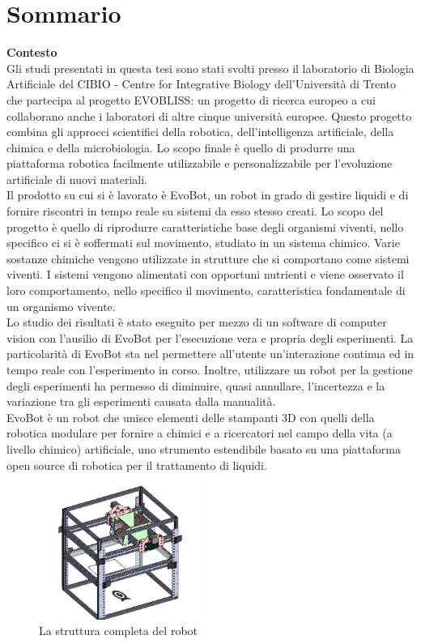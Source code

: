 \chapter*{Sommario} %
\label{sommario}

\textbf{Contesto}
\\Gli studi presentati in questa tesi sono stati svolti presso il laboratorio di Biologia Artificiale del CIBIO - Centre for Integrative Biology dell'Università di Trento che partecipa al progetto EVOBLISS: un progetto di ricerca europeo a cui collaborano anche i laboratori di altre cinque università europee. Questo progetto combina gli approcci scientifici della robotica, dell'intelligenza artificiale, della chimica e della microbiologia. Lo scopo finale è quello di produrre una piattaforma robotica facilmente utilizzabile e personalizzabile per l'evoluzione artificiale di nuovi materiali. 
\\Il prodotto su cui si è lavorato è EvoBot, un robot in grado di gestire liquidi e di fornire riscontri in tempo reale su sistemi da esso stesso creati. Lo scopo del progetto è quello di riprodurre caratteristiche base degli organismi viventi, nello specifico ci si è soffermati sul movimento, studiato in un sistema chimico. Varie sostanze chimiche vengono utilizzate in strutture che si comportano come sistemi viventi. I sistemi vengono alimentati con opportuni nutrienti e viene osservato il loro comportamento, nello specifico il movimento, caratteristica fondamentale di un organismo vivente. 
\\Lo studio dei risultati è stato eseguito per mezzo di un software di computer vision con l'ausilio di EvoBot per l’esecuzione vera e propria degli esperimenti. La particolarità di EvoBot sta nel permettere all'utente un'interazione continua ed in tempo reale con l'esperimento in corso.\cite{introd-robot} Inoltre, utilizzare un robot per la gestione degli esperimenti ha permesso di diminuire, quasi annullare, l'incertezza e la variazione tra gli esperimenti causata dalla manualità. 
\\EvoBot è un robot che unisce elementi delle stampanti 3D con quelli della robotica modulare per fornire a chimici e a ricercatori nel campo della vita (a livello chimico) artificiale, uno strumento estendibile basato su una piattaforma open source di robotica per il trattamento di liquidi.
\begin{figure}
\begin{center}
	  \includegraphics[width=0.48\textwidth]{immagini/observational-layer.png}
\end{center}
	 \caption{La struttura completa del robot}
	\end{figure} 
